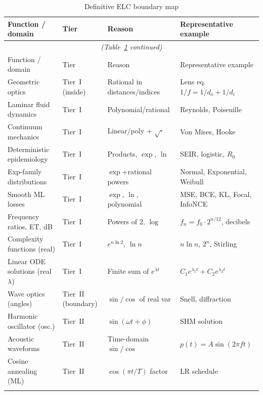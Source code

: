 \documentclass[12pt,a4paper]{article}
\theoremstyle{definition}
\begin{document}
\begin{longtable}{@{}p{3.6cm}p{2.8cm}p{3.8cm}p{3.2cm}@{}}
\caption{Definitive ELC boundary map}
\label{tab:map}\\
\toprule
Function / domain & Tier & Reason & Representative example \\
\midrule
\endfirsthead
\multicolumn{4}{c}{\emph{(Table~\ref{tab:map} continued)}}\\
\toprule
Function / domain & Tier & Reason & Representative example \\
\midrule
\endhead
\bottomrule
\endfoot
\rowcolor{insidegreen}
Geometric optics & Tier~I (inside) & Rational in distances/indices & Lens eq.\ $1/f=1/d_o+1/d_i$ \\
\rowcolor{insidegreen}
Laminar fluid dynamics & Tier~I & Polynomial/rational & Reynolds, Poiseuille \\
\rowcolor{insidegreen}
Continuum mechanics & Tier~I & Linear/poly + $\sqrt{\cdot}$ & Von Mises, Hooke \\
\rowcolor{insidegreen}
Deterministic epidemiology & Tier~I & Products, $\exp$, $\ln$ & SEIR, logistic, $R_0$ \\
\rowcolor{insidegreen}
Exp-family distributions & Tier~I & $\exp$+rational powers & Normal, Exponential, Weibull \\
\rowcolor{insidegreen}
Smooth ML losses & Tier~I & $\exp$, $\ln$, polynomial & MSE, BCE, KL, Focal, InfoNCE \\
\rowcolor{insidegreen}
Frequency ratios, ET, dB & Tier~I & Powers of 2, $\log$ & $f_n=f_0\cdot 2^{n/12}$, decibels \\
\rowcolor{insidegreen}
Complexity functions (real) & Tier~I & $e^{n\ln 2}$, $\ln n$ & $n\ln n$, $2^n$, Stirling \\
\rowcolor{insidegreen}
Linear ODE solutions (real $\lambda$) & Tier~I & Finite sum of $e^{\lambda t}$ & $C_1 e^{\lambda_1 t}+C_2 e^{\lambda_2 t}$ \\[4pt]
\rowcolor{boundaryyellow}
Wave optics (angles) & Tier~II (boundary) & $\sin/\cos$ of real var & Snell, diffraction \\
\rowcolor{boundaryyellow}
Harmonic oscillator (osc.) & Tier~II & $\sin(\omega t+\phi)$ & SHM solution \\
\rowcolor{boundaryyellow}
Acoustic waveforms & Tier~II & Time-domain $\sin/\cos$ & $p(t)=A\sin(2\pi ft)$ \\
\rowcolor{boundaryyellow}
Cosine annealing (ML) & Tier~II & $\cos(\pi t/T)$ factor & LR schedule \\[4pt]
\rowcolor{outsidered}

\end{longtable}
\end{document}
